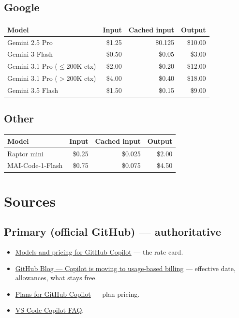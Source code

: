 \documentclass[11pt,a4paper]{article}
\begin{document}
\subsection*{Google}
\begin{table}[h]
\centering\small
\begin{tabular}{@{}lrrr@{}}
\toprule
\textbf{Model} & \textbf{Input} & \textbf{Cached input} & \textbf{Output} \\
\midrule
Gemini 2.5 Pro                  & \$1.25 & \$0.125 & \$10.00 \\
Gemini 3 Flash                  & \$0.50 & \$0.05  & \$3.00 \\
Gemini 3.1 Pro ($\leq$200K ctx) & \$2.00 & \$0.20  & \$12.00 \\
Gemini 3.1 Pro ($>$200K ctx)    & \$4.00 & \$0.40  & \$18.00 \\
Gemini 3.5 Flash                & \$1.50 & \$0.15  & \$9.00 \\
\bottomrule
\end{tabular}
\end{table}

\subsection*{Other}
\begin{table}[h]
\centering\small
\begin{tabular}{@{}lrrr@{}}
\toprule
\textbf{Model} & \textbf{Input} & \textbf{Cached input} & \textbf{Output} \\
\midrule
Raptor mini       & \$0.25 & \$0.025 & \$2.00 \\
MAI-Code-1-Flash  & \$0.75 & \$0.075 & \$4.50 \\
\bottomrule
\end{tabular}
\end{table}

\section{Sources}\label{app:sources}

\subsection*{Primary (official GitHub) --- authoritative}
\begin{itemize}
  \item \href{https://docs.github.com/en/copilot/reference/copilot-billing/models-and-pricing}{Models and pricing for GitHub Copilot} --- the rate card.
  \item \href{https://github.blog/news-insights/company-news/github-copilot-is-moving-to-usage-based-billing/}{GitHub Blog --- Copilot is moving to usage-based billing} --- effective date, allowances, what stays free.
  \item \href{https://docs.github.com/en/copilot/get-started/plans}{Plans for GitHub Copilot} --- plan pricing.
  \item \href{https://code.visualstudio.com/docs/copilot/faq}{VS Code Copilot FAQ}.
\end{itemize}
\end{document}
